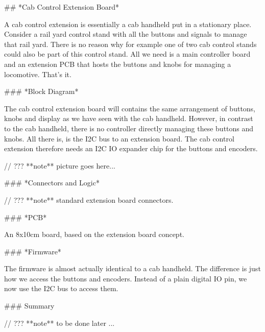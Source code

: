 ## *Cab Control Extension Board*

A cab control extension is essentially a cab handheld put in a stationary place. Consider a rail yard control stand with all the buttons and signals to manage that rail yard. There is no reason why for example one of two cab control stands could also be part of this control stand. All we need is a main controller board and an extension PCB that hosts the buttons and knobs for managing a locomotive. That's it.

### *Block Diagram*

The cab control extension board will contains the same arrangement of buttons, knobs and display as we have seen with the cab handheld. However, in contrast to the cab handheld, there is no controller directly managing these buttons and knobs. All there is, is the I2C bus to an extension board. The cab control extension therefore needs an I2C IO expander chip for the buttons and encoders.

// ??? **note** picture goes here...

### *Connectors and Logic*

// ??? **note** standard extension board connectors.

### *PCB*

An 8x10cm board, based on the extension board concept.

### *Firmware*

The firmware is almost actually identical to a cab handheld. The difference is just how we access the buttons and encoders. Instead of a plain digital IO pin, we now use the I2C bus to access them.

### Summary

// ??? **note** to be done later ...
